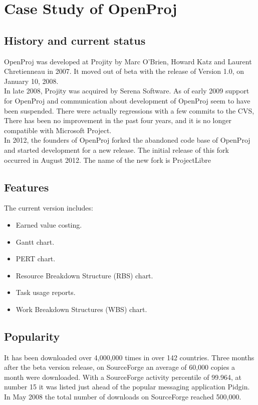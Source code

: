 \chapter{Case Study of OpenProj}
\label{Practical:4}
\section{History and current status}
OpenProj was developed at Projity by Marc O'Brien, Howard Katz and Laurent Chretienneau
in 2007. It moved out of beta with the release of Version 1.0, on January 10, 2008.\\
In late 2008, Projity was acquired by Serena Software. As of early 2009 support for OpenProj
and communication about development of OpenProj seem to have been suspended. There were
actually regressions with a few commits to the CVS, There has been no improvement in the
past four years, and it is no longer compatible with Microsoft Project.\\
In 2012, the founders of OpenProj forked the abandoned code base of OpenProj and started
development for a new release. The initial release of this fork occurred in August 2012. The
name of the new fork is ProjectLibre
\section{Features}
The current version includes:
\begin{itemize}
	\item Earned value costing.
	\item Gantt chart.
	\item PERT chart.
	\item Resource Breakdown Structure (RBS) chart. 
	\item Task usage reports.
	\item Work Breakdown Structures (WBS) chart.
	
\end{itemize}
\section{Popularity}
It has been downloaded over 4,000,000 times in over 142 countries. Three months after the
beta version release, on SourceForge an average of 60,000 copies a month were downloaded.
With a SourceForge activity percentile of 99.964, at number 15 it was listed just ahead of the
popular messaging application Pidgin. In May 2008 the total number of downloads on
SourceForge reached 500,000.

